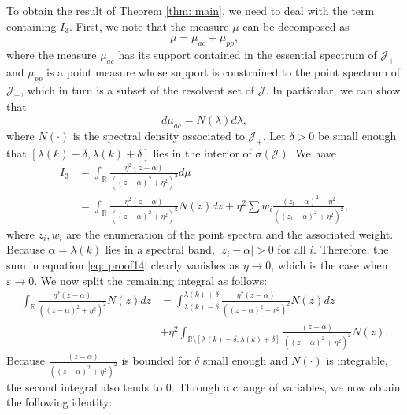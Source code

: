 \documentclass[a4paper,reqno,twoside]{amsart}
\numberwithin{equation}{section}
\theoremstyle{definition}
\newcommand{\<}{\ensuremath \leq}
\renewcommand{\>}{\ensuremath \geq}
\renewcommand{\epsilon}{\varepsilon}
\begin{document}
To obtain the result of Theorem \ref{thm: main}, we need to deal with the term containing $I_3$. First, we note that the measure $\mu$ can be decomposed as
\begin{equation}
    \mu=\mu_{ac} + \mu_{pp},
\end{equation}
where the measure $\mu_{ac}$ has its support contained in the essential spectrum of $\mathcal{J}_+$ and $\mu_{pp}$ is a point measure whose support is constrained to the point spectrum of $\mathcal{J}_+$, which in turn is a subset of the resolvent set of $\mathcal{J}$. In particular, we can show that
\begin{equation}
    d\mu_{ac} = N(\lambda)d\lambda,
\end{equation}
where $N(\cdot)$ is the spectral density associated to $\mathcal{J}_+$.
Let $\delta>0$ be small enough that $[\lambda(k)-\delta,\lambda(k)+\delta]$ lies in the interior of $\sigma(\mathcal{J})$. We have
\begin{equation}\label{eq: proof14}
    \begin{aligned}
        I_3&=\int_\mathbb{R}\frac{\eta^2(z-\alpha)}{((z-\alpha)^2+\eta^2)^2}d\mu\\
        &=\int_\mathbb{R}\frac{\eta^2(z-\alpha)}{((z-\alpha)^2+\eta^2)^2}N(z)dz + \eta^2\sum w_i\frac{(z_i-\alpha)^2-\eta^2}{((z_i-\alpha)^2+\eta^2)^2},
    \end{aligned}
\end{equation}
where $z_i,w_i$ are the enumeration of the point spectra and the associated weight. Because $\alpha = \lambda(k)$ lies in a spectral band, $\lvert z_i-\alpha\rvert>0$ for all $i$. Therefore, the sum in equation \eqref{eq: proof14} clearly vanishes as $\eta\rightarrow0$, which is the case when $\epsilon\rightarrow0$. We now split the remaining integral as follows:
\begin{equation}
    \begin{aligned}
        \int_\mathbb{R}\frac{\eta^2(z-\alpha)}{((z-\alpha)^2+\eta^2)^2}N(z)dz &= \int_{\lambda(k)-\delta}^{\lambda(k)+\delta}\frac{\eta^2(z-\alpha)}{((z-\alpha)^2+\eta^2)^2}N(z)dz\\
        &+ \eta^2\int_{\mathbb{R}\setminus[\lambda(k)-\delta,\lambda(k)+\delta]}\frac{(z-\alpha)}{((z-\alpha)^2+\eta^2)^2}N(z).
    \end{aligned}
\end{equation}
Because $\frac{(z-\alpha)}{((z-\alpha)^2+\eta^2)^2}$ is bounded for $\delta$ small enough and $N(\cdot)$ is integrable, the second integral also tends to 0. Through a change of variables, we now obtain the following identity:
\end{document}
